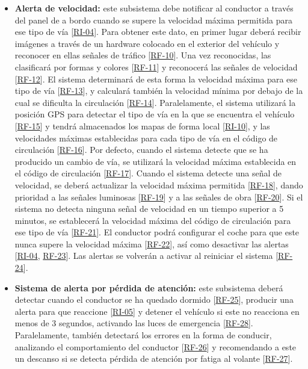 \begin{itemize}[-]
\item \textbf{Alerta de velocidad:}  este subsistema debe notificar al conductor a través del panel de a bordo cuando se supere la velocidad máxima permitida para ese tipo de vía [\hyperref[tab:RI-04]{RI-04}]. Para obtener este dato, en primer lugar deberá recibir imágenes a través de un hardware colocado en el exterior del vehículo y reconocer en ellas señales de tráfico [\hyperref[tab:RF-10]{RF-10}]. Una vez reconocidas, las clasificará por formas y colores [\hyperref[tab:RF-11]{RF-11}] y reconocerá las señales de velocidad [\hyperref[tab:RF-12]{RF-12}]. El sistema determinará de esta forma la velocidad máxima para ese tipo de vía [\hyperref[tab:RF-13]{RF-13}], y calculará también la velocidad mínima por debajo de la cual se dificulta la circulación [\hyperref[tab:RF-14]{RF-14}]. Paralelamente, el sistema utilizará la posición GPS para detectar el tipo de vía en la que se encuentra el vehículo [\hyperref[tab:RF-15]{RF-15}] y tendrá almacenados los mapas de forma local [\hyperref[tab:RI-10]{RI-10}], y las velocidades máximas establecidas para cada tipo de vía en el código de circulación [\hyperref[tab:RF-16]{RF-16}]. Por defecto, cuando el sistema detecte que se ha producido un cambio de vía, se utilizará la velocidad máxima establecida en el código de circulación [\hyperref[tab:RF-17]{RF-17}]. Cuando el sistema detecte una señal de velocidad, se deberá actualizar la velocidad máxima permitida [\hyperref[tab:RF-18]{RF-18}], dando prioridad a las señales luminosas [\hyperref[tab:RF-19]{RF-19}] y a las señales de obra [\hyperref[tab:RF-20]{RF-20}]. Si el sistema no detecta ninguna señal de velocidad en un tiempo superior a 5 minutos, se establecerá la velocidad máxima del código de circulación para ese tipo de vía [\hyperref[tab:RF-21]{RF-21}]. El conductor podrá configurar el coche para que este nunca supere la velocidad máxima [\hyperref[tab:RF-22]{RF-22}], así como desactivar las alertas [\hyperref[tab:RI-04]{RI-04}, \hyperref[tab:RF-23]{RF-23}]. Las alertas se volverán a activar al reiniciar el sistema [\hyperref[tab:RF-24]{RF-24}].
\item \textbf{Sistema de alerta por pérdida de atención:} este subsistema deberá detectar cuando el conductor se ha quedado dormido [\hyperref[tab:RF-25]{RF-25}], producir una alerta para que reaccione [\hyperref[tab:RI-05]{RI-05}] y detener el vehículo si este no reacciona en menos de 3 segundos, activando las luces de emergencia [\hyperref[tab:RF-28]{RF-28}]. Paralelamente, también detectará los errores en la forma de conducir, analizando el comportamiento del conductor [\hyperref[tab:RF-26]{RF-26}] y recomendando a este un descanso si se detecta pérdida de atención por fatiga al volante [\hyperref[tab:RF-27]{RF-27}].

\end{itemize}
